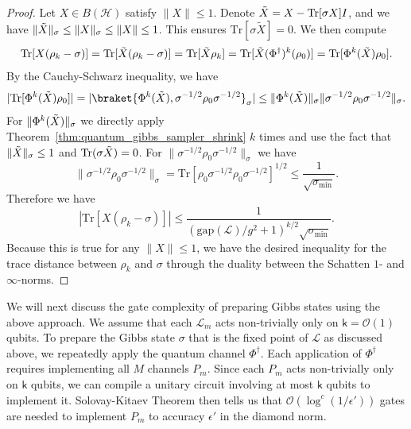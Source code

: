 \documentclass{article}
\theoremstyle{plain}
\theoremstyle{plain}
\theoremstyle{plain}
\theoremstyle{plain}
\theoremstyle{plain}
\theoremstyle{plain}
\theoremstyle{plain}
\newcommand{\Tr}{\mathrm{Tr}}
\newcommand{\Or}{\mathcal{O}}
\begin{document}
\begin{proof}
    Let $X\in B(\mathcal{H})$ satisfy $\|X\|\leq 1$. Denote $\Tilde{X} = X - \Tr[\sigma X] I$, and we have $\|\Tilde{X}\|_\sigma\leq \|X\|_\sigma\leq \|X\|\leq 1$. This ensures $\Tr[\sigma\tilde{X}]=0$. We then compute
    \[
    \Tr[X(\rho_k-\sigma)] = \Tr[\Tilde{X}(\rho_k-\sigma)]=\Tr[\Tilde{X}\rho_k]=\Tr[\Tilde{X}(\Phi^\dag)^k(\rho_0)] = \Tr[\Phi^k(\Tilde{X})\rho_0].
    \]
    By the Cauchy-Schwarz inequality, we have
    \[
    |\Tr[\Phi^k(\Tilde{X})\rho_0]|=|\braket{\Phi^k(\Tilde{X}),\sigma^{-1/2}\rho_0\sigma^{-1/2}}_\sigma|\leq \|\Phi^k(\Tilde{X})\|_\sigma\|\sigma^{-1/2}\rho_0\sigma^{-1/2}\|_\sigma.
    \]
    For $\|\Phi^k(\Tilde{X})\|_\sigma$ we directly apply Theorem~\ref{thm:quantum_gibbs_sampler_shrink} $k$ times and use the fact that $\|\Tilde{X}\|_\sigma\leq 1$ and $\Tr(\sigma \Tilde{X}) = 0$. For $\|\sigma^{-1/2}\rho_0\sigma^{-1/2}\|_\sigma$ we have
    \[
    \|\sigma^{-1/2}\rho_0\sigma^{-1/2}\|_\sigma = \Tr[\rho_0\sigma^{-1/2}\rho_0\sigma^{-1/2}]^{1/2}\leq \frac{1}{\sqrt{\sigma_{\min}}}.
    \]
    Therefore we have
    \[
    |\Tr[X(\rho_k-\sigma)]|\leq \frac{1}{(\mathrm{gap}(\mathcal{L})/g^2+1)^{k/2}\sqrt{\sigma_{\min}}}.
    \]
    Because this is true for any $\|X\|\leq 1$, we have the desired inequality for the trace distance between $\rho_k$ and $\sigma$ through the duality between the Schatten $1$- and $\infty$-norms.
\end{proof}



We will next discuss the gate complexity of preparing Gibbs states using the above approach. We assume that each $\mathcal{L}_m$ acts non-trivially only on $\mathsf{k}=\Or(1)$ qubits. To prepare the Gibbs state $\sigma$ that is the fixed point of $\mathcal{L}$ as discussed above, we repeatedly apply the quantum channel $\Phi^\dag$. Each application of $\Phi^\dag$ requires implementing all $M$ channels $P_m$. Since each $P_m$ acts non-trivially only on $\mathsf{k}$ qubits, we can compile a unitary circuit involving at most $\mathsf{k}$ qubits to implement it. Solovay-Kitaev Theorem then tells us that $\Or(\log^c(1/\epsilon'))$ gates are needed to implement $P_m$ to accuracy $\epsilon'$ in the diamond norm.
\end{document}
